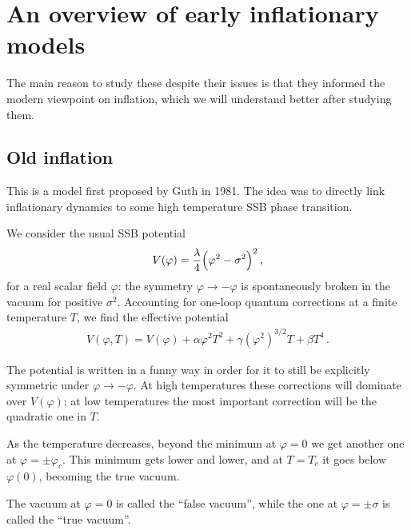 \documentclass[main.tex]{subfiles}
\begin{document}
\section{An overview of early inflationary models}


The main reason to study these despite their issues is that they informed the modern viewpoint on inflation, which we will understand better after studying them.

\subsection{Old inflation}

This is a model first proposed by Guth in 1981.
The idea was to directly link inflationary dynamics to some high temperature SSB phase transition. 

We consider the usual SSB potential  
%
\begin{align}
V(\varphi ) = \frac{\lambda}{4} \qty(\varphi^2 - \sigma^2)^2
\,,
\end{align}
%
for a real scalar field \(\varphi \): the symmetry \(\varphi \to -\varphi \) is spontaneously broken in the vacuum for positive \(\sigma^2\). 
Accounting for one-loop quantum corrections at a finite temperature \(T\), we find the effective potential 
%
\begin{align}
V(\varphi , T) = V(\varphi ) 
+ \alpha  \varphi^2 T^2
+ \gamma (\varphi^2)^{3/2} T
+ \beta T^{4} 
\,.
\end{align}

The potential is written in a funny way in order for it to still be explicitly symmetric under \(\varphi \to - \varphi \).  
At high temperatures these corrections will dominate over \(V(\varphi )\); at low temperatures the most important correction will be the quadratic one in \(T\). 


As the temperature decreases, beyond the minimum at \(\varphi = 0\) we get another one at \(\varphi = \pm \varphi_c\). 
This minimum gets lower and lower, and at \(T = T_c\) it goes below \(\varphi (0)\), becoming the true vacuum. 

The vacuum at \(\varphi = 0\) is called the ``false vacuum'', while the one at \(\varphi = \pm \sigma \) is called the ``true vacuum''.
\end{document}

